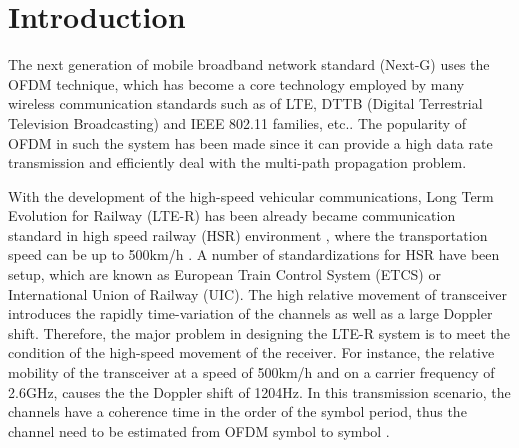 \documentclass[AMA]{WileyNJD-v1}
\begin{document}
\maketitle
	
	
	
\section{Introduction}\label{section-1}

The next generation of mobile broadband network standard (Next-G) uses the OFDM technique, which has become a core technology employed by many wireless communication standards such as of LTE, DTTB (Digital Terrestrial Television Broadcasting) and IEEE 802.11 families, etc.. The popularity of OFDM in such the system has been made since it can provide a high data rate transmission and efficiently deal with the multi-path propagation problem. 
	
With the development of the high-speed vehicular communications, Long Term Evolution for Railway (LTE-R) has been already became communication standard in high speed railway (HSR) environment \cite{Luo2012,Fokum2010}, where the transportation speed can be up to 500km/h \cite{Banerjee2016}. A number of standardizations for HSR have been setup, which are known as European Train Control System (ETCS) or International Union of Railway (UIC). The high relative movement of transceiver introduces the  rapidly time-variation of the channels as well as a large Doppler shift. Therefore, the major problem in designing the LTE-R system is to meet the condition of the high-speed movement of the receiver. For instance, the relative mobility of the transceiver at a speed of 500km/h and on a carrier frequency of 2.6GHz, causes the the Doppler shift of 1204Hz. In this transmission scenario, the channels have a coherence time in the order of the symbol period,  thus the channel need to be estimated from OFDM symbol to symbol \cite{Barhumi2005}.
\end{document}

